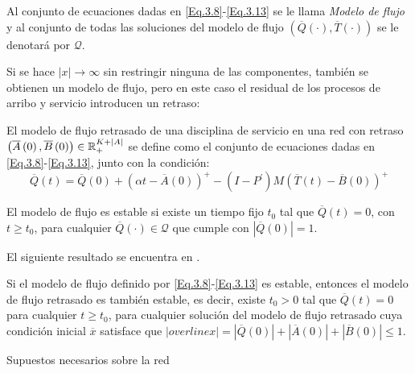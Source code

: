 Al conjunto de ecuaciones dadas en \ref{Eq.3.8}-\ref{Eq.3.13} se
le llama {\em Modelo de flujo} y al conjunto de todas las
soluciones del modelo de flujo
$\left(\overline{Q}\left(\cdot\right),\overline{T}
\left(\cdot\right)\right)$ se le denotar\'a por $\mathcal{Q}$.

Si se hace $|x|\rightarrow\infty$ sin restringir ninguna de las
componentes, tambi\'en se obtienen un modelo de flujo, pero en
este caso el residual de los procesos de arribo y servicio
introducen un retraso:

\begin{Def}
El modelo de flujo retrasado de una disciplina de servicio en una
red con retraso
$\left(\overline{A}\left(0\right),\overline{B}\left(0\right)\right)\in\mathbb{R}_{+}^{K+|A|}$
se define como el conjunto de ecuaciones dadas en
\ref{Eq.3.8}-\ref{Eq.3.13}, junto con la condici\'on:
\begin{equation}\label{CondAd.FluidModel}
\overline{Q}\left(t\right)=\overline{Q}\left(0\right)+\left(\alpha
t-\overline{A}\left(0\right)\right)^{+}-\left(I-P^{'}\right)M\left(\overline{T}\left(t\right)-\overline{B}\left(0\right)\right)^{+}
\end{equation}
\end{Def}

\begin{Def}
El modelo de flujo es estable si existe un tiempo fijo $t_{0}$ tal
que $\overline{Q}\left(t\right)=0$, con $t\geq t_{0}$, para
cualquier $\overline{Q}\left(\cdot\right)\in\mathcal{Q}$ que
cumple con $|\overline{Q}\left(0\right)|=1$.
\end{Def}

El siguiente resultado se encuentra en \cite{Chen}.
\begin{Lemma}
Si el modelo de flujo definido por \ref{Eq.3.8}-\ref{Eq.3.13} es
estable, entonces el modelo de flujo retrasado es tambi\'en
estable, es decir, existe $t_{0}>0$ tal que
$\overline{Q}\left(t\right)=0$ para cualquier $t\geq t_{0}$, para
cualquier soluci\'on del modelo de flujo retrasado cuya
condici\'on inicial $\overline{x}$ satisface que
$|overline{x}|=|\overline{Q}\left(0\right)|+|\overline{A}\left(0\right)|+|\overline{B}\left(0\right)|\leq1$.
\end{Lemma}

Supuestos necesarios sobre la red

